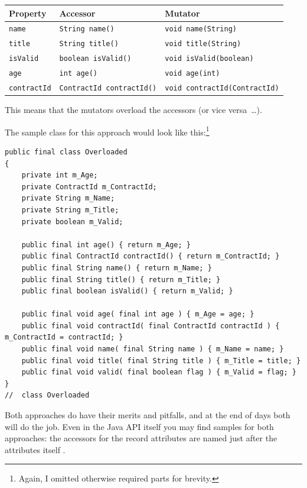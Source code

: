 \begin{tabular}{|l|l|l|}
\hline 
\textbf{Property} & \textbf{Accessor} & \textbf{Mutator} \\ 
\hline 
\texttt{name} & \lstinline|String name()| & \lstinline|void name(String)| \\ 
\texttt{title} & \lstinline|String title()| & \lstinline|void title(String)| \\ 
\texttt{isValid} & \lstinline|boolean isValid()| & \lstinline|void isValid(boolean)| \\ 
\texttt{age} & \lstinline|int age()| & \lstinline|void age(int)| \\ 
\texttt{contractId} & \lstinline|ContractId contractId()| & \lstinline|void contractId(ContractId)| \\ 
\hline 
\end{tabular}

This means that the mutators overload the accessors (or vice versa~…).

The sample class for this approach would look like this:\footnote{Again, I omitted otherwise required parts for brevity.}
\begin{lstlisting}[caption={Overloaded Methods}]
public final class Overloaded
{
    private int m_Age;
    private ContractId m_ContractId;
    private String m_Name;
    private String m_Title;
    private boolean m_Valid;

    public final int age() { return m_Age; }
    public final ContractId contractId() { return m_ContractId; }
    public final String name() { return m_Name; }
    public final String title() { return m_Title; }
    public final boolean isValid() { return m_Valid; }

    public final void age( final int age ) { m_Age = age; }
    public final void contractId( final ContractId contractId ) { m_ContractId = contractId; }
    public final void name( final String name ) { m_Name = name; }
    public final void title( final String title ) { m_Title = title; }
    public final void valid( final boolean flag ) { m_Valid = flag; }
}
//  class Overloaded
\end{lstlisting}

Both approaches do have their merits and pitfalls, and at the end of days both will do the job. Even in the Java API itself you may find samples for both approaches: the accessors for the record attributes are named just after the attributes itself \autocite{ORACLE_DOC_LANGUAGE_SPECIFICATION:RecordMembers}.

